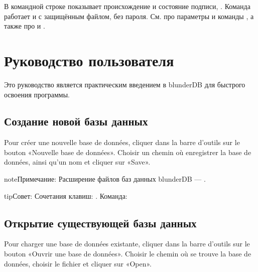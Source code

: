 \documentclass[letterpaper,10pt,russian]{sphinxmanual}
\begin{document}
\sphinxAtStartPar
В командной строке  показывает происхождение и состояние подписи, . Команда работает и с защищённым файлом, без пароля. См.  про параметры  и  команды , а также про  и .

\sphinxstepscope


\section{Руководство пользователя}
\label{\detokenize{guide_utilisateur:guide-utilisateur}}\label{\detokenize{guide_utilisateur:id1}}\label{\detokenize{guide_utilisateur::doc}}
\sphinxAtStartPar
Это руководство является практическим введением в blunderDB для быстрого освоения программы.


\subsection{Создание новой базы данных}
\label{\detokenize{guide_utilisateur:creer-une-nouvelle-base-de-donnees}}
\sphinxAtStartPar
Pour créer une nouvelle base de données, cliquer dans la barre d’outils sur le
bouton «Nouvelle base de données». Choisir un chemin où enregistrer la base de
données, ainsi qu’un nom et cliquer sur «Save».

\begin{sphinxadmonition}{note}{Примечание:}
\sphinxAtStartPar
Расширение файлов баз данных blunderDB — .
\end{sphinxadmonition}

\begin{sphinxadmonition}{tip}{Совет:}
\sphinxAtStartPar
Сочетания клавиш: . Команда: 
\end{sphinxadmonition}


\subsection{Открытие существующей базы данных}
\label{\detokenize{guide_utilisateur:ouvrir-une-base-de-donnee-existante}}
\sphinxAtStartPar
Pour charger une base de données existante, cliquer dans la barre d’outils sur
le bouton «Ouvrir une base de données». Choisir le chemin où se trouve la base
de données, choisir le fichier  et cliquer sur «Open».
\end{document}
